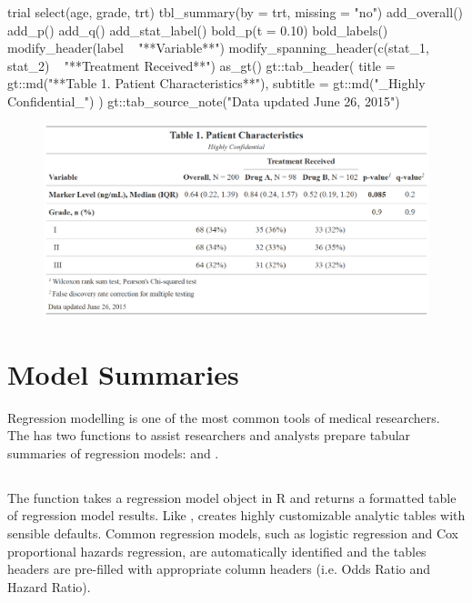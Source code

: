 \newpage
\begin{example}
trial %
  select(age, grade, trt) %
tbl_summary(by = trt, missing = "no") %
  add_overall() %
  add_p() %
  add_q() %
  add_stat_label() %
  bold_p(t = 0.10) %
  bold_labels() %
  modify_header(label ~ "**Variable**") %
  modify_spanning_header(c(stat_1, stat_2) ~ "**Treatment Received**") %
  as_gt() %
  gt::tab_header(
    title = gt::md("**Table 1. Patient Characteristics**"),
    subtitle = gt::md("_Highly Confidential_")
  ) %
  gt::tab_source_note("Data updated June 26, 2015")
\end{example}
\begin{figure}[h!]
  \includegraphics[scale=0.35]{custom.png}
  \centering
\end{figure}

\section{Model Summaries}

Regression modelling is one of the most common tools of medical researchers.
The  has two functions to assist researchers and analysts prepare tabular summaries of regression models:  and .

\subsection{\texorpdfstring{}{tbl\_regression()}}

The  function takes a regression model object in R and returns a formatted table of regression model results. 
Like ,  creates highly customizable analytic tables with sensible defaults.
Common regression models, such as logistic regression and Cox proportional hazards regression, are automatically identified and the tables headers are pre-filled with appropriate column headers (i.e. Odds Ratio and Hazard Ratio).

